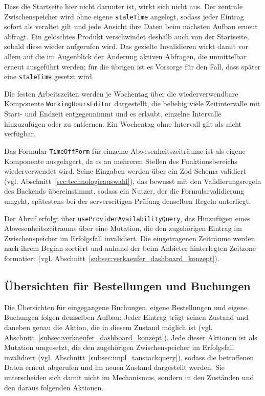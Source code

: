 Dass die Startseite hier nicht darunter ist, wirkt sich nicht aus.
Der zentrale Zwischenspeicher wird ohne eigene \texttt{staleTime}
angelegt, sodass jeder Eintrag sofort als veraltet gilt und jede
Ansicht ihre Daten beim nächsten Aufbau erneut abfragt. Ein gelöschtes
Produkt verschwindet deshalb auch von der Startseite, sobald diese
wieder aufgerufen wird. Das gezielte Invalidieren wirkt damit vor
allem auf die im Augenblick der Änderung aktiven Abfragen, die
unmittelbar erneut ausgeführt werden; für die übrigen ist es Vorsorge
für den Fall, dass später eine \texttt{staleTime} gesetzt wird.

Die festen Arbeitszeiten werden je Wochentag über die
wiederverwendbare Komponente \texttt{WorkingHoursEditor} dargestellt,
die beliebig viele Zeitintervalle mit Start- und Endzeit
entgegennimmt und es erlaubt, einzelne Intervalle hinzuzufügen oder
zu entfernen. Ein Wochentag ohne Intervall gilt als nicht verfügbar.

Das Formular \texttt{TimeOffForm} für einzelne Abwesenheitszeiträume
ist als eigene Komponente ausgelagert, da es an mehreren Stellen des
Funktionsbereichs wiederverwendet wird. Seine Eingaben werden über
ein Zod-Schema validiert (vgl.
Abschnitt~\ref{sec:technologieauswahl}), das bewusst mit den
Validierungsregeln des Backends übereinstimmt, sodass ein Nutzer, der
die Formularvalidierung umgeht, spätestens bei der serverseitigen
Prüfung denselben Regeln unterliegt.

Der Abruf erfolgt über \texttt{useProviderAvailabilityQuery}, das
Hinzufügen eines Abwesenheitszeitraums über eine Mutation, die den
zugehörigen Eintrag im Zwischenspeicher im Erfolgsfall invalidiert.
Die eingetragenen Zeiträume werden nach ihrem Beginn sortiert und
anhand der beim Anbieter hinterlegten Zeitzone formatiert (vgl.
Abschnitt~\ref{subsec:verkaeufer_dashboard_konzept}).

\subsection{Übersichten für Bestellungen und Buchungen}
\label{subsec:impl_provider_bookings}
\label{subsec:impl_bestellungen}
\label{subsec:impl_buchungen}

Die Übersichten für eingegangene Buchungen, eigene Bestellungen und
eigene Buchungen folgen demselben Aufbau: Jeder Eintrag trägt seinen
Zustand und daneben genau die Aktion, die in diesem Zustand möglich
ist (vgl. Abschnitt~\ref{subsec:verkaeufer_dashboard_konzept}). Jede
dieser Aktionen ist als Mutation umgesetzt, die den zugehörigen
Zwischenspeicher im Erfolgsfall invalidiert (vgl.
Abschnitt~\ref{subsec:impl_tanstackquery}), sodass die betroffenen
Daten erneut abgerufen und im neuen Zustand dargestellt werden. Sie unterscheiden sich damit nicht im
Mechanismus, sondern in den Zuständen und den daraus folgenden
Aktionen.

